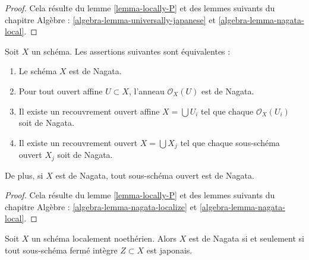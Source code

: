 \begin{proof}
Cela résulte du lemme \ref{lemma-locally-P} et des lemmes suivants du chapitre Algèbre : \ref{algebra-lemma-universally-japanese} et
\ref{algebra-lemma-nagata-local}.
\end{proof}

\begin{lemma}
\label{lemma-locally-nagata}
Soit $X$ un schéma. Les assertions suivantes sont équivalentes :
\begin{enumerate}
\item Le schéma $X$ est de Nagata.
\item Pour tout ouvert affine $U \subset X$, l'anneau $\mathcal{O}_X(U)$
est de Nagata.
\item Il existe un recouvrement ouvert affine $X = \bigcup U_i$
tel que chaque $\mathcal{O}_X(U_i)$ soit de Nagata.
\item Il existe un recouvrement ouvert $X = \bigcup X_j$
tel que chaque sous-schéma ouvert $X_j$ soit de Nagata.
\end{enumerate}
De plus, si $X$ est de Nagata, tout sous-schéma ouvert est de Nagata.
\end{lemma}

\begin{proof}
Cela résulte du lemme \ref{lemma-locally-P} et des lemmes suivants du chapitre Algèbre : \ref{algebra-lemma-nagata-localize} et
\ref{algebra-lemma-nagata-local}.
\end{proof}

\begin{lemma}
\label{lemma-characterize-nagata}
Soit $X$ un schéma localement noethérien.
Alors $X$ est de Nagata si et seulement si tout sous-schéma fermé intègre
$Z \subset X$ est japonais.
\end{lemma}

